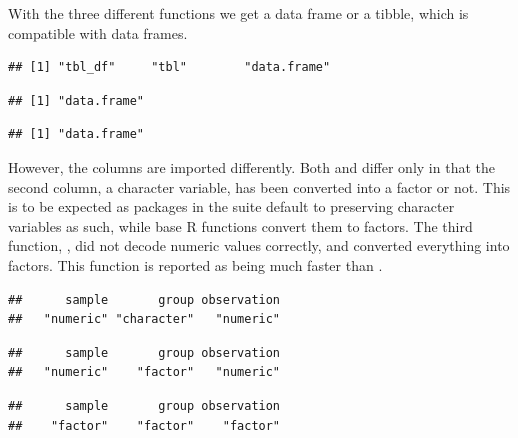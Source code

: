 \documentclass[krantz2]{krantz}\usepackage{knitr}%
\begin{document}
With the three different functions we get a data frame or a tibble, which is compatible with data frames.
\begin{knitrout}\footnotesize
{}\color{fgcolor}\begin{kframe}
\begin{alltt}
\end{alltt}
\begin{verbatim}
## [1] "tbl_df"     "tbl"        "data.frame"
\end{verbatim}
\begin{alltt}
\end{alltt}
\begin{verbatim}
## [1] "data.frame"
\end{verbatim}
\begin{alltt}
\end{alltt}
\begin{verbatim}
## [1] "data.frame"
\end{verbatim}
\end{kframe}
\end{knitrout}

However, the columns are imported differently. Both  and  differ only in that the second column, a character variable, has been converted into a factor or not. This is to be expected as packages in the  suite default to preserving character variables as such, while base R functions convert them to factors. The third function, , did not decode numeric values correctly, and converted everything into factors. This function is reported as being much faster than .
\begin{knitrout}\footnotesize
{}\color{fgcolor}\begin{kframe}
\begin{alltt}
\end{alltt}
\begin{verbatim}
##      sample       group observation 
##   "numeric" "character"   "numeric"
\end{verbatim}
\begin{alltt}
\end{alltt}
\begin{verbatim}
##      sample       group observation 
##   "numeric"    "factor"   "numeric"
\end{verbatim}
\begin{alltt}
\end{alltt}
\begin{verbatim}
##      sample       group observation 
##    "factor"    "factor"    "factor"
\end{verbatim}
\end{kframe}
\end{knitrout}
\end{document}
